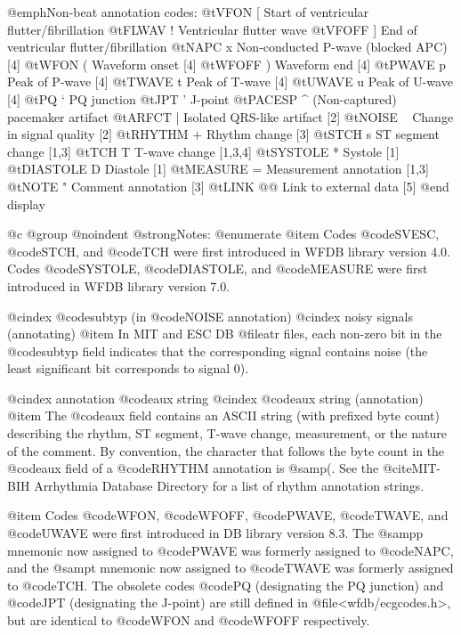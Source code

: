 {{{{{{{{{{{{{{@emph{Non-beat annotation codes:}
@t{VFON     [  } Start of ventricular flutter/fibrillation
@t{FLWAV    !  } Ventricular flutter wave
@t{VFOFF    ]  } End of ventricular flutter/fibrillation
@t{NAPC     x  } Non-conducted P-wave (blocked APC) [4]
@t{WFON     (  } Waveform onset [4]
@t{WFOFF    )  } Waveform end [4]
@t{PWAVE    p  } Peak of P-wave [4]
@t{TWAVE    t  } Peak of T-wave [4]
@t{UWAVE    u  } Peak of U-wave [4]
@t{PQ       `  } PQ junction
@t{JPT      '  } J-point
@t{PACESP   ^  } (Non-captured) pacemaker artifact
@t{ARFCT    |  } Isolated QRS-like artifact [2]
@t{NOISE    ~  } Change in signal quality [2]
@t{RHYTHM   +  } Rhythm change [3]
@t{STCH     s  } ST segment change [1,3]
@t{TCH      T  } T-wave change [1,3,4]
@t{SYSTOLE  *  } Systole [1]
@t{DIASTOLE D  } Diastole [1]
@t{MEASURE  =  } Measurement annotation [1,3]
@t{NOTE     "  } Comment annotation [3]
@t{LINK     @@  } Link to external data [5]
@end display

@c @group
@noindent
@strong{Notes:}
@enumerate
@item
Codes @code{SVESC}, @code{STCH}, and @code{TCH} were first introduced
in WFDB library version 4.0.  Codes @code{SYSTOLE}, @code{DIASTOLE}, and
@code{MEASURE} were first introduced in WFDB library version 7.0.

@cindex @code{subtyp} (in @code{NOISE} annotation)
@cindex noisy signals (annotating)
@item
In MIT and ESC DB @file{atr} files, each non-zero bit in the @code{subtyp}
field indicates that the corresponding signal contains noise (the least
significant bit corresponds to signal 0).

@cindex annotation @code{aux} string
@cindex @code{aux} string (annotation)
@item
The @code{aux} field contains an ASCII string (with prefixed byte count)
describing the rhythm, ST segment, T-wave change, measurement, or the
nature of the comment.  By convention, the character that follows the
byte count in the @code{aux} field of a @code{RHYTHM} annotation is @samp{(}.
See the @cite{MIT-BIH Arrhythmia Database Directory} for a list of rhythm
annotation strings.

@item
Codes @code{WFON}, @code{WFOFF}, @code{PWAVE}, @code{TWAVE}, and
@code{UWAVE} were first introduced in DB library version 8.3.  The
@samp{p} mnemonic now assigned to @code{PWAVE} was formerly assigned to
@code{NAPC}, and the @samp{t} mnemonic now assigned to @code{TWAVE} was
formerly assigned to @code{TCH}.  The obsolete codes @code{PQ}
(designating the PQ junction) and @code{JPT} (designating the J-point)
are still defined in @file{<wfdb/ecgcodes.h>}, but are identical to
@code{WFON} and @code{WFOFF} respectively.

}}}}}}}}}}}}}}
